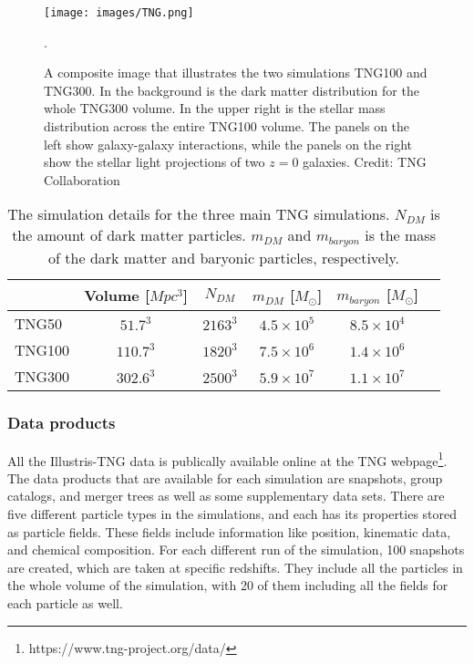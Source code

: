 \begin{figure}
    \centering
    \texttt{[image: images/TNG.png]}
    \caption{A composite image that illustrates the two simulations TNG100 and TNG300. In the background is the dark matter distribution for the whole TNG300 volume. In the upper right is the stellar mass distribution across the entire TNG100 volume. The panels on the left show galaxy-galaxy interactions, while the panels on the right show the stellar light projections of two $z=0$ galaxies. Credit: TNG Collaboration}.
    \label{tng_illustration}
\end{figure}

\begin{table}
\begin{center}
\caption{The simulation details for the three main TNG simulations. $N_{DM}$ is the amount of dark matter particles. $m_{DM}$ and $m_{baryon}$ is the mass of the dark matter and baryonic particles, respectively.}
 \label{TNG}
\begin{tabular}{ l| c c c c c } 
 \hline
 \hline
   &  Volume [$Mpc^3$] & $N_{DM}$ & $m_{DM}$ [$M_{\odot}$] & $m_{baryon}$ [$M_{\odot}$] \\
 \hline
 TNG50 & $51.7^3$ & $2163^3$ & $4.5 \times 10^5 $ & $8.5 \times 10^4 $ \\ 
 TNG100 & $110.7^3$ & $1820^3$ & $7.5 \times 10^6 $ & $1.4 \times 10^6 $  \\ 
 TNG300 & $302.6^3$ & $2500^3$ & $5.9 \times 10^7 $ & $1.1 \times 10^7 $  \\ 
 \hline 
 \end{tabular}
\end{center}
\end{table}

\subsubsection{Data products}
All the Illustris-TNG data is publically available online at the TNG webpage\footnote{https://www.tng-project.org/data/}. The data products that are available for each simulation are snapshots, group catalogs, and merger trees as well as some supplementary data sets. There are five different particle types in the simulations, and each has its properties stored as particle fields. These fields include information like position, kinematic data, and chemical composition. For each different run of the simulation, 100 snapshots are created, which are taken at specific redshifts. They include all the particles in the whole volume of the simulation, with 20 of them including all the fields for each particle as well.


